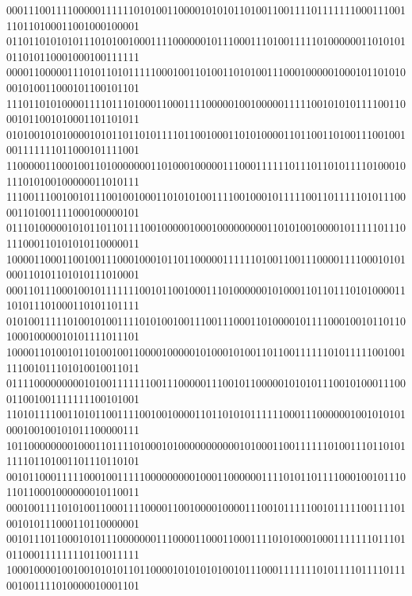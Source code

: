 \documentclass[10pt,\tflang,pdftex]{book}
\begin{document}
{{\begin{minipage}{\oldpwidth}
{{{{000111001111000001111110101001100001010101101001100111101111111000111001110110100011001000100001\\
011011010101011101010010001111000000101110001110100111110100000011010101011010110001000100111111\\
000011000001110101101011111000100110100110101001110001000001000101101010001010011000101100101101\\
111011010100001111011101000110001111000001001000001111100101010111100110001011001010001101101011\\
010100101010000101011011010111101100100011010100001101100110100111001001001111111011000101111001\\
110000011000100110100000001101000100000111000111111011101101011110100010111010100100000011010111\\
111001110010010111001001000110101010011110010001011111001101111101011100001101001111000100000101\\
011101000001010110110111100100000100010000000001101010010000101111101110111000110101010110000011\\
100001100011001001110001000101101100000111111010011001110000111100010101000110101101010111010001\\
000110111000100101111111001011001000111010000001010001101101110101000011101011101000110101101111\\
010100111110100101001111010100100111001110001101000010111100010010110110100010000010101111011101\\
100001101001011010010011000010000010100010100110110011111101011111001001111001011101010010011011\\
011110000000001010011111110011100000111001011000001010101110010100011100011001001111111100101001\\
110101111001101011001111001001000011011010101111110001110000001001010101000100100101011100000111\\
101100000000100011011110100010100000000000101000110011111101001110110101111101101001101110110101\\
001011000111110001001111100000000010001100000011110101101111000100101110110110001000000010110011\\
000100111101010011000111100001100100001000011100101111100101111100111101001010111000110110000001\\
001011101100010101110000000111000011000110001111010100010001111111011101011000111111110110011111\\
100010000100100101010110110000101010101001011100011111110101111011110111001001111010000010001101}}}}\fi

\end{minipage}}}
\end{document}
